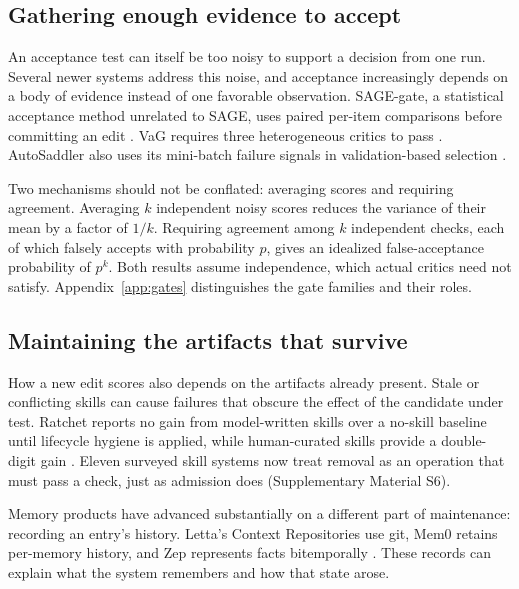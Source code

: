 \subsection{Gathering enough evidence to accept}\label{gathering-enough-evidence-to-accept}

An acceptance test can itself be too noisy to support a decision from one run. Several newer systems address this noise, and acceptance increasingly depends on a body of evidence instead of one favorable observation. SAGE-gate, a statistical acceptance method unrelated to SAGE, uses paired per-item comparisons before committing an edit \cite{wang2026sagegate}. VaG requires three heterogeneous critics to pass \cite{shang2026vag}. AutoSaddler also uses its mini-batch failure signals in validation-based selection \cite{park2026autosaddler}.

Two mechanisms should not be conflated: averaging scores and requiring agreement. Averaging \(k\) independent noisy scores reduces the variance of their mean by a factor of \(1/k\). Requiring agreement among \(k\) independent checks, each of which falsely accepts with probability \(p\), gives an idealized false-acceptance probability of \(p^k\). Both results assume independence, which actual critics need not satisfy. Appendix~\ref{app:gates} distinguishes the gate families and their roles.

\subsection{Maintaining the artifacts that survive}\label{maintaining-the-artifacts-that-survive}

How a new edit scores also depends on the artifacts already present. Stale or conflicting skills can cause failures that obscure the effect of the candidate under test. Ratchet reports no gain from model-written skills over a no-skill baseline until lifecycle hygiene is applied, while human-curated skills provide a double-digit gain \cite{zhang2026ratchet}. Eleven surveyed skill systems now treat removal as an operation that must pass a check, just as admission does \cite{zhang2026librarydrift, wei2026skillsmith, pu2026skillops, wang2026assay} (Supplementary Material S6).

Memory products have advanced substantially on a different part of maintenance: recording an entry's history. Letta's Context Repositories use git, Mem0 retains per-memory history, and Zep represents facts bitemporally \cite{letta2026memfs, mem02026history, zep2026facts}. These records can explain what the system remembers and how that state arose.

